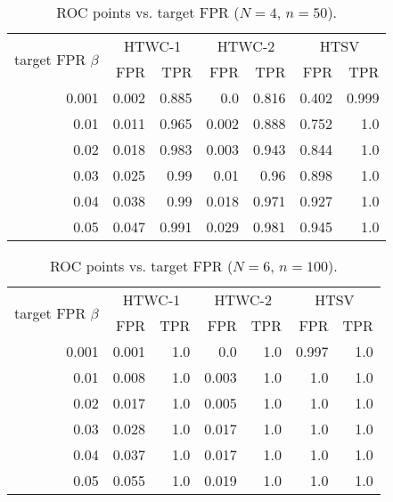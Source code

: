 \documentclass[10pt, twocolumn]{IEEEtran}
\begin{document}
\begin{table}
	\centering
	\caption{ROC points vs. target FPR ($N = 4$, $n = 50$).} \label{tab-roc}
	\begin{tabular}{rrrrrrr}
		\toprule[1.2pt]
		\multirow{2}{*}{target FPR $\beta$} &
		\multicolumn{2}{c}{HTWC-1} &
		\multicolumn{2}{c}{HTWC-2} &
		\multicolumn{2}{c}{HTSV} \\
		& {FPR} & {TPR}& {FPR} & {TPR} & {FPR} & {TPR} \\
		\midrule[1.2pt]
		0.001 & 0.002 & 0.885 & 0.0 & 0.816 & 0.402 & 0.999 \\
		0.01 & 0.011 & 0.965 & 0.002 & 0.888 & 0.752 & 1.0 \\
		0.02 & 0.018 & 0.983 & 0.003 & 0.943 & 0.844 & 1.0 \\
		0.03 & 0.025 & 0.99 & 0.01 & 0.96 & 0.898 & 1.0 \\
		0.04 & 0.038 & 0.99 & 0.018 & 0.971 & 0.927 & 1.0 \\
		0.05 & 0.047 & 0.991 & 0.029 & 0.981 & 0.945 & 1.0 \\
		\bottomrule[1.2pt]
	\end{tabular}
\end{table}


\begin{table}
	\centering
	\caption{ROC points vs. target FPR ($N = 6$, $n = 100$).} \label{tab-roc-2}
	\begin{tabular}{rrrrrrr}
		\toprule[1.2pt]
		\multirow{2}{*}{target FPR $\beta$} &
		\multicolumn{2}{c}{HTWC-1} &
		\multicolumn{2}{c}{HTWC-2} &
		\multicolumn{2}{c}{HTSV} \\
		& {FPR} & {TPR}& {FPR} & {TPR} & {FPR} & {TPR} \\
		\midrule[1.2pt]
		0.001 & 0.001 & 1.0 & 0.0 & 1.0 & 0.997 & 1.0 \\
		0.01 & 0.008 & 1.0 & 0.003 & 1.0 & 1.0 & 1.0 \\
		0.02 & 0.017 & 1.0 & 0.005 & 1.0 & 1.0 & 1.0 \\
		0.03 & 0.028 & 1.0 & 0.017 & 1.0 & 1.0 & 1.0 \\
		0.04 & 0.037 & 1.0 & 0.017 & 1.0 & 1.0 & 1.0 \\
		0.05 & 0.055 & 1.0 & 0.019 & 1.0 & 1.0 & 1.0 \\
		\bottomrule[1.2pt]
	\end{tabular}
\end{table}


\end{document}

